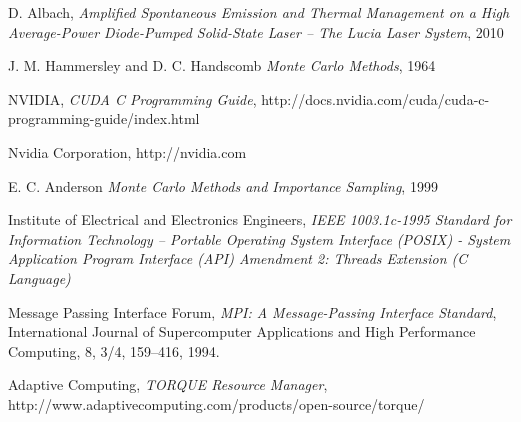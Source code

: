 \begin{thebibliography}{9}


    D. Albach,
    \emph{Amplified Spontaneous Emission and Thermal Management on a High Average-Power Diode-Pumped Solid-State Laser \--- The Lucia Laser System},
    2010

    J. M. Hammersley and D. C. Handscomb
    \emph{Monte Carlo Methods},
    1964

    NVIDIA,
    \emph{CUDA C Programming Guide},
    http://docs.nvidia.com/cuda/cuda-c-programming-guide/index.html

    Nvidia Corporation,
    http://nvidia.com

    E. C. Anderson
    \emph{Monte Carlo Methods and Importance Sampling},
    1999

    Institute of Electrical and Electronics Engineers,
    \emph{IEEE 1003.1c-1995 Standard for Information Technology \---
    Portable Operating System Interface (POSIX) \-- System Application Program Interface (API) Amendment 2: Threads Extension (C Language)}

    Message Passing Interface Forum,
    \emph{MPI: A Message-Passing Interface Standard}, 
    International Journal of Supercomputer Applications and High Performance Computing,
    8, 3/4, 159–416, 1994.

    Adaptive Computing,
    \emph{TORQUE Resource Manager},
    http://www.adaptivecomputing.com/products/open-source/torque/




\end{thebibliography}
